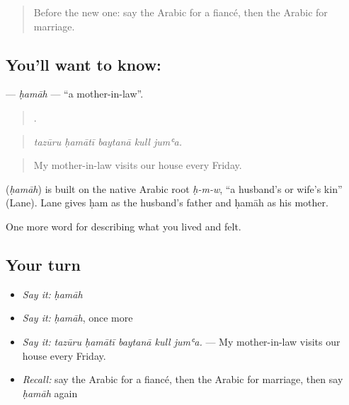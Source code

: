 \label{lesson:AR-C528-hamah}



\begin{quote}
Before the new one: say the Arabic for a fiancé, then the Arabic for marriage.
\end{quote}

\subsection*{You'll want to know: }
\textbf{} — \emph{ḥamāh} — \textquotedblleft{}a mother-in-law\textquotedblright{}.

\begin{quote}
    .
\end{quote}

\begin{quote}
\emph{tazūru ḥamātī baytanā kull jumʿa.}
\end{quote}

\begin{quote}
My mother-in-law visits our house every Friday.
\end{quote}

\begin{cousinweb}
\textbf{} (\emph{ḥamāh}) is built on the native Arabic root \emph{ḥ-m-w}, \textquotedblleft{}a husband's or wife's kin\textquotedblright{} (Lane). Lane gives ḥam as the husband's father and ḥamāh as his mother.
\end{cousinweb}

\begin{grammarlens}[title={What you've built}]
One more word for describing what you lived and felt.
\end{grammarlens}

\subsection*{Your turn}
\begin{itemize}
\raggedright
  \item \emph{Say it:} \emph{ḥamāh}
  \item \emph{Say it:} \emph{ḥamāh}, once more
  \item \emph{Say it:} \emph{tazūru ḥamātī baytanā kull jumʿa.} — My mother-in-law visits our house every Friday.
  \item \emph{Recall:} say the Arabic for a fiancé, then the Arabic for marriage, then say \emph{ḥamāh} again
\end{itemize}

